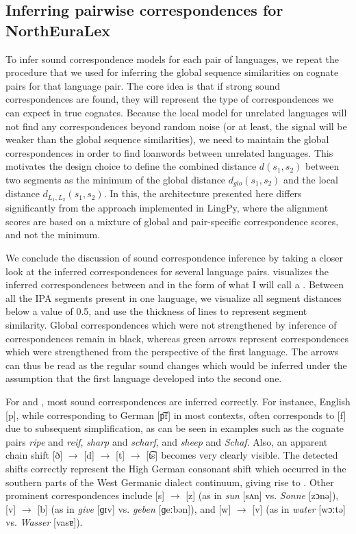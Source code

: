 \subsection{Inferring pairwise correspondences for NorthEuraLex}
To infer sound correspondence models for each pair of languages, we repeat the procedure that we
used for inferring the global sequence similarities on cognate pairs for that language pair.
The core idea is that if strong sound correspondences are found, they will represent the
type of correspondences we can expect in true cognates. Because the local model for unrelated
languages will not find any correspondences beyond random noise (or at least, the signal will
be weaker than the global sequence similarities), we need to maintain the global correspondences
in order to find loanwords between unrelated languages. This motivates the design choice
to define the combined distance $d(s_1,s_2)$ between two segments as the minimum
of the global distance $d_{glo}(s_1,s_2)$ and the local distance $d_{L_1,L_2}(s_1,s_2)$.
In this, the architecture presented here differs significantly from the approach implemented
in LingPy, where the alignment scores are based on a mixture of global and pair-specific
correspondence scores, and not the minimum.

We conclude the discussion of sound correspondence inference by taking a closer look at the inferred correspondences for several language pairs.  visualizes the inferred correspondences between  and  in the form of what I will call a \textit{}. Between all the IPA segments present in one language, we visualize all segment distances below a value of 0.5, and use the thickness of lines to represent segment similarity. Global correspondences which were not strengthened by inference of correspondences remain in black, whereas green arrows represent correspondences which were strengthened from the perspective of the first language. The arrows can thus be read as the regular sound changes which would be inferred under the assumption that the first language developed into the second one.

For  and , most sound correspondences are inferred correctly. For instance, English [p], while corresponding to German [p͡f] in most contexts, often corresponds to [f] due to subsequent simplification, as can be seen in examples such as the cognate pairs \textit{ripe} and \textit{reif}, \textit{sharp} and \textit{scharf}, and \textit{sheep} and \textit{Schaf}. Also, an apparent chain shift [ð] $\rightarrow$ [d] $\rightarrow$ [t] $\rightarrow$ [t͡s] becomes very clearly visible. The detected shifts correctly represent the High German consonant shift which occurred in the southern parts of the West Germanic dialect continuum, giving rise to . Other prominent correspondences include [s] $\rightarrow$ [z] (as in \textit{sun} [sʌn] vs. \textit{Sonne} [zɔnə]), [v] $\rightarrow$ [b] (as in \textit{give} [ɡɪv] vs. \textit{geben} [ɡeːbən]), and [w] $\rightarrow$ [v] (as in \textit{water} [wɔːtə] vs. \textit{Wasser} [vasɐ]).


